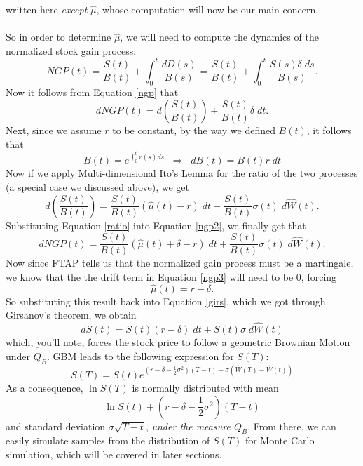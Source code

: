 \documentclass[12pt]{article}
\theoremstyle{plain}
\theoremstyle{definition}
\theoremstyle{remark}
\begin{document}
written here \emph{except} $\hat{\mu}$, whose computation will
now be our main concern.
\\
\\
So in order to determine $\hat{\mu}$, we will need to compute
the dynamics of the normalized stock gain process:
\begin{equation}
   \label{ngp}
   NGP(t) = \frac{S(t)}{B(t)} + \int^t_0 \frac{dD(s)}{B(s)} =
   \frac{S(t)}{B(t)} + \int^t_0 \frac{S(s)\delta \; ds }{B(s)}.
\end{equation}
Now it follows from Equation \ref{ngp} that
\begin{equation}
   \label{ngp2}
   dNGP(t) = d\left(\frac{S(t)}{B(t)}\right) + \frac{S(t)}{B(t)}
      \delta \; dt. 
\end{equation}
Next, since we assume $r$ to be constant, by the way we defined 
$B(t)$, it follows that 
   \[ B(t) = e^{\int^t_0 r(s) ds} \;\; \Rightarrow 
      \;\; dB(t) = B(t)r \;dt\]
Now if we apply Multi-dimensional Ito's Lemma for the ratio of the
two processes (a special case we discussed above), we get
\begin{equation}
   \label{ratio}
   d\left(\frac{S(t)}{B(t)}\right) = \frac{S(t)}{B(t)} 
      \left(\hat{\mu}(t) - r\right) \; dt + \frac{S(t)}{B(t)}\sigma(t)
      \; d\hat{W}(t).
\end{equation}
Substituting Equation \ref{ratio} into Equation \ref{ngp2}, we finally
get that
\begin{equation}
   \label{ngp3}
   dNGP(t) = \frac{S(t)}{B(t)}\left(\hat{\mu}(t) + \delta - r\right)
   \; dt + \frac{S(t)}{B(t)} \sigma(t) \; d\hat{W}(t).
\end{equation}
Now since FTAP tells us that the normalized gain process must be 
a martingale, we know that the the drift term in Equation \ref{ngp3}
will need to be 0, forcing
   \[ \hat{\mu}(t)= r - \delta.\]
So substituting this result back into Equation \ref{girs}, which
we got through Girsanov's theorem, we obtain
   \[ dS(t) = S(t)(r - \delta) \; dt + S(t)\sigma \; d\hat{W}(t)\]
which, you'll note, forces the stock price to follow a geometric
Brownian Motion under $Q_B$. GBM leads to the following expression
for $S(T)$:
   \[ S(T) = S(t) e^{\left(r - \delta -\frac{1}{2}\sigma^2\right)
      (T-t) + \sigma(\hat{W}(T) - \hat{W}(t))} \]
As a consequence, $\ln S(T)$ is normally distributed with mean
   \[ \ln S(t) + \left(r - \delta - \frac{1}{2}\sigma^2\right) (T-t) \]
and standard deviation $\sigma\sqrt{T-t}$, \emph{under the measure 
$Q_B$}.  From there, we can
easily simulate samples from the distribution of $S(T)$ for 
Monte Carlo simulation, which will be covered in later sections.
\end{document}
